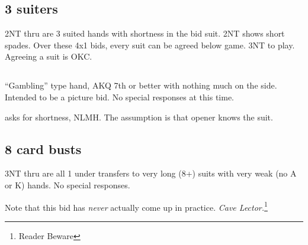 \documentclass[tom-jenni]{subfile}
\begin{document}

	\subsection{3 suiters}
	
	2NT thru  are 3 suited hands with shortness in the bid suit. 2NT shows short spades. Over these 4x1 bids, every suit can be agreed below game. 3NT to play.  Agreeing a suit is OKC.
		
	\subsection[3S]{}
	
	``Gambling'' type hand, AKQ 7th or better with nothing much on the side. Intended to be a picture bid. No special responses at this time. 

	 asks for shortness, NLMH.  The assumption is that opener knows the suit. 
	
	\subsection{8 card busts}
	
	3NT thru  are all 1 under transfers to very long (8+) suits with very weak (no A or K) hands. No special responses.
	
	Note that this bid has \textit{never} actually come up in practice.  \textit{Cave Lector.}\footnote{Reader Beware}
\end{document}
